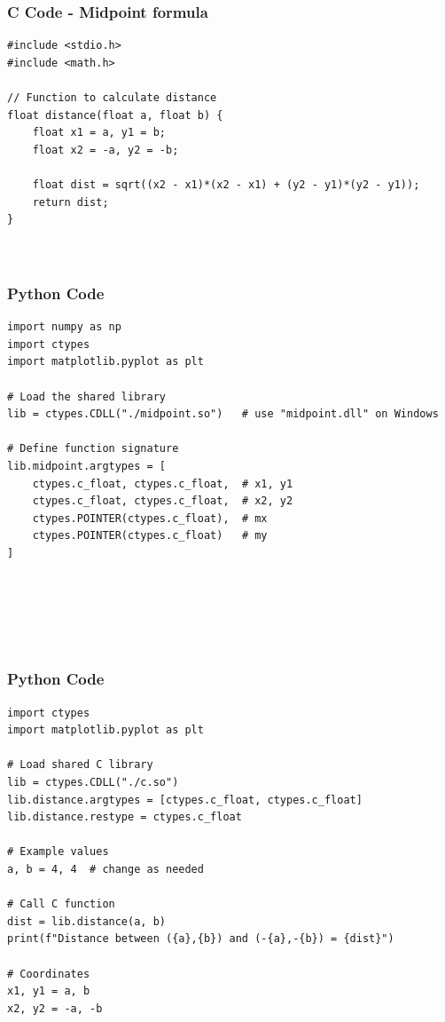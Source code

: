 \documentclass{beamer}
\begin{document}
\begin{frame}[fragile]
    \frametitle{C Code - Midpoint formula }

    \begin{lstlisting}
#include <stdio.h>
#include <math.h>

// Function to calculate distance
float distance(float a, float b) {
    float x1 = a, y1 = b;
    float x2 = -a, y2 = -b;

    float dist = sqrt((x2 - x1)*(x2 - x1) + (y2 - y1)*(y2 - y1));
    return dist;
}



    \end{lstlisting}
\end{frame}


\begin{frame}[fragile]
    \frametitle{Python Code}
    \begin{lstlisting}
import numpy as np
import ctypes
import matplotlib.pyplot as plt

# Load the shared library
lib = ctypes.CDLL("./midpoint.so")   # use "midpoint.dll" on Windows

# Define function signature
lib.midpoint.argtypes = [
    ctypes.c_float, ctypes.c_float,  # x1, y1
    ctypes.c_float, ctypes.c_float,  # x2, y2
    ctypes.POINTER(ctypes.c_float),  # mx
    ctypes.POINTER(ctypes.c_float)   # my
]






    \end{lstlisting}
\end{frame}

\begin{frame}[fragile]
    \frametitle{Python Code}
    \begin{lstlisting}
import ctypes
import matplotlib.pyplot as plt

# Load shared C library
lib = ctypes.CDLL("./c.so")
lib.distance.argtypes = [ctypes.c_float, ctypes.c_float]
lib.distance.restype = ctypes.c_float

# Example values
a, b = 4, 4  # change as needed

# Call C function
dist = lib.distance(a, b)
print(f"Distance between ({a},{b}) and (-{a},-{b}) = {dist}")

# Coordinates
x1, y1 = a, b
x2, y2 = -a, -b







    \end{lstlisting}
\end{frame}
\end{document}
